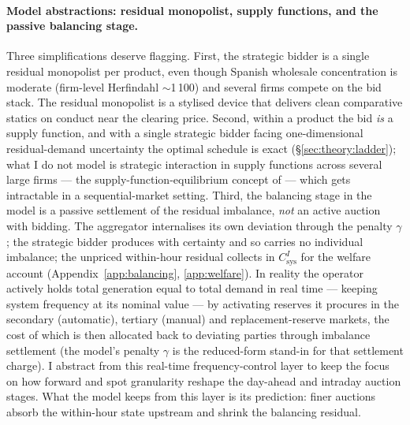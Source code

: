 \documentclass[11pt,a4paper]{article}
\theoremstyle{definition}
\theoremstyle{remark}
\theoremstyle{plain}
\begin{document}
\paragraph{Model abstractions: residual monopolist, supply functions, and the passive balancing stage.} Three simplifications deserve flagging. First, the strategic bidder is a single residual monopolist per product, even though Spanish wholesale concentration is moderate (firm-level Herfindahl $\sim$1\,100) and several firms compete on the bid stack. The residual monopolist is a stylised device that delivers clean comparative statics on conduct near the clearing price. Second, within a product the bid \emph{is} a supply function, and with a single strategic bidder facing one-dimensional residual-demand uncertainty the optimal schedule is exact (\S\ref{sec:theory:ladder}); what I do not model is strategic interaction in supply functions across several large firms --- the supply-function-equilibrium concept of \citet{klemperer_meyer_1989} --- which gets intractable in a sequential-market setting. Third, the balancing stage in the model is a passive settlement of the residual imbalance, \emph{not} an active auction with bidding. The aggregator internalises its own deviation through the penalty $\gamma$; the strategic bidder produces with certainty and so carries no individual imbalance; the unpriced within-hour residual collects in $C^I_{\text{sys}}$ for the welfare account (Appendix~\ref{app:balancing}, \ref{app:welfare}). In reality the operator actively holds total generation equal to total demand in real time --- keeping system frequency at its nominal value --- by activating reserves it procures in the secondary (automatic), tertiary (manual) and replacement-reserve markets, the cost of which is then allocated back to deviating parties through imbalance settlement (the model's penalty $\gamma$ is the reduced-form stand-in for that settlement charge). I abstract from this real-time frequency-control layer to keep the focus on how forward and spot granularity reshape the day-ahead and intraday auction stages. What the model keeps from this layer is its prediction: finer auctions absorb the within-hour state upstream and shrink the balancing residual.
\end{document}
